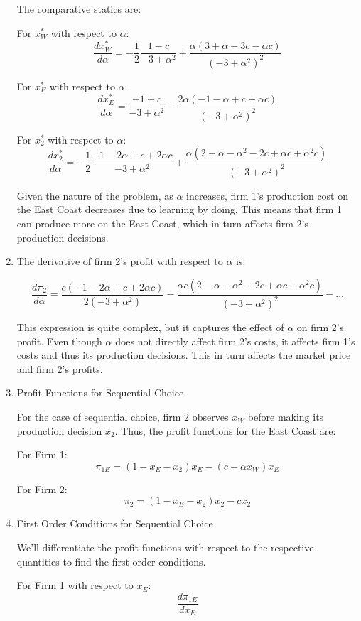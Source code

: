 \documentclass[UTF8,titlepage]{article}
\numberwithin{figure}{section}
\begin{document}
\begin{enumerate}
The comparative statics are:

For \(x_W^*\) with respect to \(\alpha\):
\[ \frac{dx_W^*}{d\alpha} = -\frac{1}{2} \frac{1 - c}{-3 + \alpha^2} + \frac{\alpha (3 + \alpha - 3 c - \alpha c)}{(-3 + \alpha^2)^2} \]

For \(x_E^*\) with respect to \(\alpha\):
\[ \frac{dx_E^*}{d\alpha} = \frac{-1 + c}{-3 + \alpha^2} - \frac{2 \alpha (-1 - \alpha + c + \alpha c)}{(-3 + \alpha^2)^2} \]

For \(x_2^*\) with respect to \(\alpha\):
\[ \frac{dx_2^*}{d\alpha} = -\frac{1}{2} \frac{-1 - 2 \alpha + c + 2 \alpha c}{-3 + \alpha^2} + \frac{\alpha (2 - \alpha - \alpha^2 - 2 c + \alpha c + \alpha^2 c)}{(-3 + \alpha^2)^2} \]

Given the nature of the problem, as \(\alpha\) increases, firm 1's production cost on the East Coast decreases due to learning by doing. This means that firm 1 can produce more on the East Coast, which in turn affects firm 2's production decisions.

\item The derivative of firm 2's profit with respect to \(\alpha\) is:

\[ \frac{d\pi_2}{d\alpha} = \frac{c (-1 - 2 \alpha + c + 2 \alpha c)}{2 (-3 + \alpha^2)} - \frac{\alpha c (2 - \alpha - \alpha^2 - 2 c + \alpha c + \alpha^2 c)}{(-3 + \alpha^2)^2} - \ldots \]

This expression is quite complex, but it captures the effect of \(\alpha\) on firm 2's profit. Even though \(\alpha\) does not directly affect firm 2's costs, it affects firm 1's costs and thus its production decisions. This in turn affects the market price and firm 2's profits.

\item Profit Functions for Sequential Choice

For the case of sequential choice, firm 2 observes \(x_W\) before making its production decision \(x_2\). Thus, the profit functions for the East Coast are:

For Firm 1:
\[ \pi_{1E} = (1-x_E-x_2) x_E - (c-\alpha x_W) x_E \]

For Firm 2:
\[ \pi_2 = (1-x_E-x_2) x_2 - c x_2 \]

\item First Order Conditions for Sequential Choice

We'll differentiate the profit functions with respect to the respective quantities to find the first order conditions.

For Firm 1 with respect to \(x_E\):
\[ \frac{d\pi_{1E}}{dx_E} \]


\end{enumerate}
\end{document}
